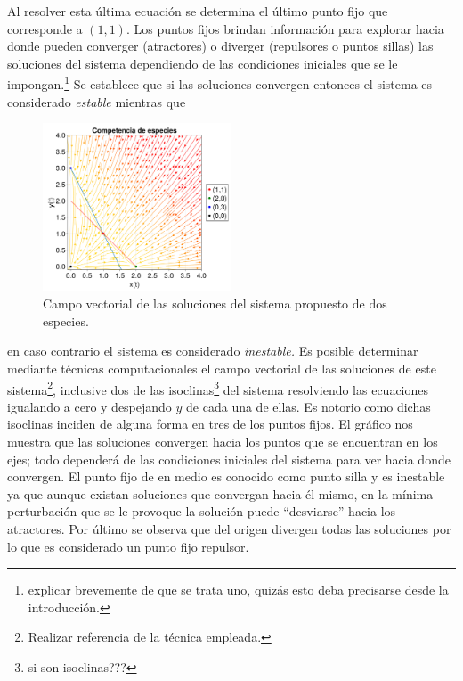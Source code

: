 Al resolver esta última ecuación se determina el último punto fijo que corresponde a $(1,1)$. Los puntos fijos brindan información para explorar hacia donde pueden converger (atractores) o diverger (repulsores o puntos sillas) las soluciones del sistema dependiendo de las condiciones iniciales que se le impongan.\footnote{explicar brevemente de que se trata uno, quizás esto deba precisarse desde la introducción.} Se establece que si las soluciones convergen entonces el sistema es considerado \textit{estable} mientras que 
\begin{figure} \vspace{-30pt} \begin{center}
		\includegraphics[width=0.5\textwidth]{../Imagenes/Competencia de especies} 
	\end{center} 
	\vspace{-20pt} 
	\caption{Campo vectorial de las soluciones del sistema propuesto de dos especies.} 
	\vspace{-10pt}
	\label{fig:CompetenciaEspecies}
\end{figure} 
en caso contrario el sistema es considerado \textit{inestable.} Es posible determinar mediante técnicas computacionales el campo vectorial de las soluciones de este sistema\footnote{Realizar referencia de la técnica empleada.}, inclusive dos de las isoclinas\footnote{si son isoclinas???} del sistema resolviendo las ecuaciones igualando a cero y despejando $y$ de cada una de ellas. Es notorio como dichas isoclinas inciden de alguna forma en tres de los puntos fijos. El gráfico nos muestra que las soluciones convergen hacia los puntos que se encuentran en los ejes; todo dependerá de las condiciones iniciales del sistema para ver hacia donde convergen. El punto fijo de en medio es conocido como punto silla y es inestable ya que aunque existan soluciones que convergan hacia él mismo, en la mínima perturbación que se le provoque la solución puede ``desviarse'' hacia los atractores. Por último se observa que del origen divergen todas las soluciones por lo que es considerado un punto fijo repulsor.\\
